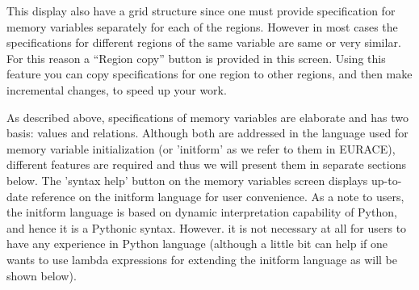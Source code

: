 \documentclass[10pt]{article}
\begin{document}
This display also have a grid structure since one must provide specification for memory variables separately for each of the regions. However in most cases the specifications for different regions of the same variable are same or very similar. For this reason a ``Region copy'' button is provided in this screen. Using this feature you can copy specifications for one region to other regions, and then make incremental changes, to speed up your work.

As described above, specifications of memory variables are elaborate and has two basis: values and relations. Although both are addressed in the language used for memory variable initialization (or 'initform' as we refer to them in EURACE), different features are required and thus we will present them in separate sections below. The 'syntax help' button on the memory variables screen displays up-to-date reference on the initform language for user convenience. As a note to users, the initform language is based on dynamic interpretation capability of Python, and hence it is a Pythonic syntax. However. it is not necessary at all for users to have any experience in Python language (although a little bit can help if one wants to use lambda expressions for extending the initform language as will be shown below).
\end{document}
